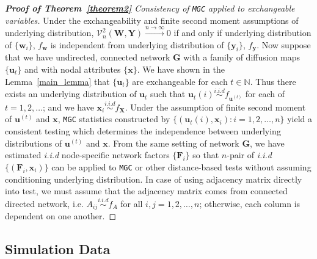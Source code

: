\documentclass[11pt]{article}
\theoremstyle{definition}
\begin{document}
\begin{proof}[\textbf{Proof of Theorem~\ref{theorem2}} Consistency of \texttt{MGC} applied to exchangeable variables]
	
Under the exchangeability and finite second moment assumptions of underlying distribution, $\mathcal{V}^{2}_{n}(\mathbf{W},\mathbf{Y}) \xrightarrow{n \rightarrow \infty}  0$ if and only if underlying distribution of $\{\mathbf{w}_{i} \}$, $f_{\mathbf{w}}$ is independent from underlying distribution of $\{ \mathbf{y}_{i}  \}$, $f_{\mathbf{y}}$. Now suppose that we have undirected, connected network $\mathbf{G}$ with a family of diffusion maps $\{ \mathbf{u}_{t}  \}$ and with nodal attributes $\{ \mathbf{x}  \}$. We have shown in the Lemma~\ref{main_lemma} that $\{ \mathbf{u}_{t}  \}$ are exchangeable for each $t \in \mathbb{N}$. Thus there exists an underlying distribution of $\mathbf{u}_{t}$ such that $\mathbf{u}_{t}(i) \overset{i.i.d}{\sim} f_{\mathbf{u}^{(t)}}$ for each of $t= 1,2,\ldots $; and we have $\mathbf{x}_{i} \overset{i.i.d}{\sim} f_{\mathbf{X}}$. Under the assumption of finite second moment of $\mathbf{u}^{(t)}$ and $\mathbf{x}$, \texttt{MGC} statistics constructed by $\{  (  \mathbf{u}_{t}(i), \mathbf{x}_{i} ) : i = 1,2,\ldots, n  \}$ yield a consistent testing which determines the independence between underlying distributions of $\mathbf{u}^{(t)}$ and $\mathbf{x}$. From the same setting of network $\mathbf{G}$, we have estimated \textit{i.i.d} node-specific network factors $\{ \mathbf{F}_{i} \}$ so that $n$-pair of \textit{i.i.d} $\{ ( \mathbf{F}_{i}, \mathbf{x}_{i} )  \}$ can be applied to \texttt{MGC} or other distance-based tests without assuming conditioning underlying distribution. In case of using adjacency matrix directly into test, we must assume that the adjacency matrix comes from connected directed network, i.e. $A_{ij} \overset{i.i.d}{\sim} f_{A}$ for all $i,j=1,2,\ldots, n$; otherwise, each column is dependent on one another.  
\end{proof}

\subsection{Simulation Data}
\label{ssec:models}
\end{document}
